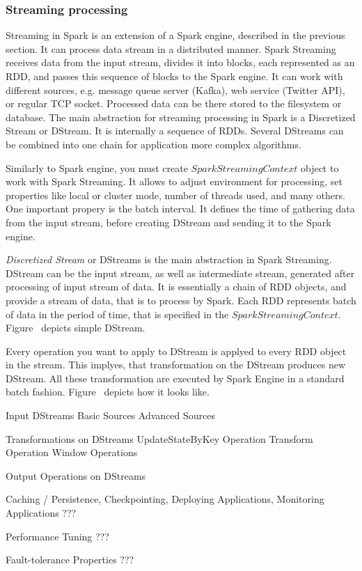 \subsubsection{Streaming processing}

Streaming in Spark is an extension of a Spark engine, described in the previous section.
It can process data stream in a distributed manner.
Spark Streaming receives data from the input stream, divides it into blocks, each represented as an RDD, and passes this sequence of blocks to the Spark engine.
It can work with different sources, e.g. message queue server (Kafka), web service (Twitter API), or regular TCP socket.
Processed data can be there stored to the filesystem or database.
The main abstraction for streaming processing in Spark is a Discretized Stream or DStream.
It is internally a sequence of RDDs.
Several DStreams can be combined into one chain for application more complex algorithms. 

Similarly to Spark engine, you must create $SparkStreamingContext$ object to work with Spark Streaming.
It allows to adjust environment for processing, set properties like local or cluster mode, number of threads used, and many others.
One important propery is the batch interval.
It defines the time of gathering data from the input stream, before creating DStream and sending it to the Spark engine.

\textit{Discretized Stream} or DStreams is the main abstraction in Spark Streaming.
DStream can be the input stream, as well as intermediate stream, generated after processing of input stream of data.
It is essentially a chain of RDD objects, and provide a stream of data, that is to process by Spark.
Each RDD represents batch of data in the period of time, that is specified in the $SparkStreamingContext$.
Figure~ depicts simple DStream.



Every operation you want to apply to DStream is applyed to every RDD object in the stream.
This implyes, that transformation on the DStream produces new DStream.
All these transformation are executed by Spark Engine in a standard batch fashion.
Figure~ depicts how it looks like.

Input DStreams
Basic Sources
Advanced Sources

Transformations on DStreams
UpdateStateByKey Operation
Transform Operation
Window Operations

Output Operations on DStreams

Caching / Persistence, Checkpointing, Deploying Applications, Monitoring Applications ???

Performance Tuning ???

Fault-tolerance Properties ???